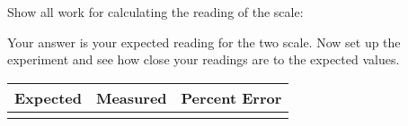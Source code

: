 \documentclass[10pt]{exam}
\begin{document}
\begin{questions}
\begin{EnvUplevel}
  \end{EnvUplevel}

  \question
	  Show all work for calculating the reading of the scale:

    \question
	  Your answer is your expected reading for the two scale.  Now set up the experiment and see how close your readings are to the expected values.

    \begin{tabular}{*{3}{|p{12em}}|}
      \hline
      Expected & Measured & Percent Error \\
      \hline
      && \\[2em]
      \hline
    \end{tabular}


  
\end{questions}
\end{document}
